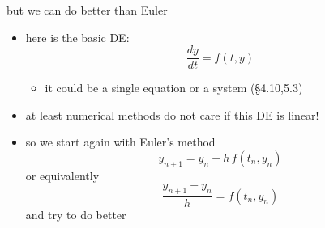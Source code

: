 \documentclass[urlcolor=blue,dvipsnames]{beamer}
\begin{document}
\begin{frame}{but we can do better than Euler}

\begin{itemize}
\item here is the basic DE:
    $$\frac{dy}{dt} = f(t,y)$$

\vspace{-2mm}
    \begin{itemize}
    \item it could be a single equation or a system (\S4.10,5.3)
    \end{itemize}
\item at least numerical methods do not care if this DE is linear!
\item so we start again with Euler's method
    $$y_{n+1} = y_n + h\, f(t_n,y_n)$$
or equivalently
    $$\frac{y_{n+1} - y_n}{h} = f(t_n,y_n)$$
and \alert{try to do better}
\end{itemize}
\end{frame}
\end{document}

